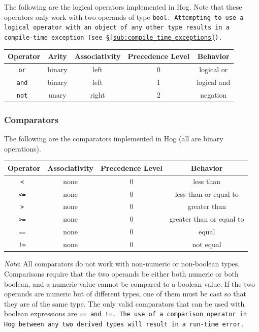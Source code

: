 \documentclass{report}
\begin{document}
The following are the logical operators implemented in Hog. Note that these
operators only work with two operands of type \tt bool\rm. Attempting to use a
logical operator with an object of any other type results in a compile-time
exception (see \S \ref{sub:compile_time_exceptions}).

\begin{center}
\begin{tabular}{|c|c|c|c|c|}

\hline \textbf{Operator} & \textbf{Arity} & \textbf{Associativity} &
\textbf{Precedence Level} & \textbf{Behavior} \\ \hline
\tt or \rm & binary & left & 0 & logical or \\ \hline
\tt and \rm & binary & left & 1 & logical and \\ \hline
\tt not \rm & unary & right & 2 & negation \\ \hline
\end{tabular}
\end{center}


\subsubsection{Comparators} %
\label{ssub:comparators}

The following are the comparators implemented in Hog (all are binary operations).

\begin{center}
\begin{tabular}{|c|c|c|c|}

\hline \textbf{Operator} & \textbf{Associativity} &
\textbf{Precedence Level} & \textbf{Behavior} \\ \hline
\tt < \rm & none & 0 & less than \\ \hline
\tt <= \rm & none & 0 & less than or equal to \\ \hline
\tt > \rm & none & 0 & greater than \\ \hline
\tt >= \rm & none & 0 & greater than or equal to \\ \hline
\tt == \rm & none & 0 & equal \\ \hline
\tt != \rm & none & 0 & not equal \\ \hline

\end{tabular}
\end{center}

\emph{Note}: All comparators do not work with non-numeric or non-boolean types.
Comparisons require that the two operands be either both numeric or both
boolean, and a numeric value cannot be compared to a boolean value. If the two
operands are numeric but of different types, one of them must be cast so that
they are of the same type. The only valid comparators that can be used with
boolean expressions are \tt == \rm and \tt !=\rm. The use of a comparison
operator in Hog between any two derived types will result in a run-time error.
\end{document}

